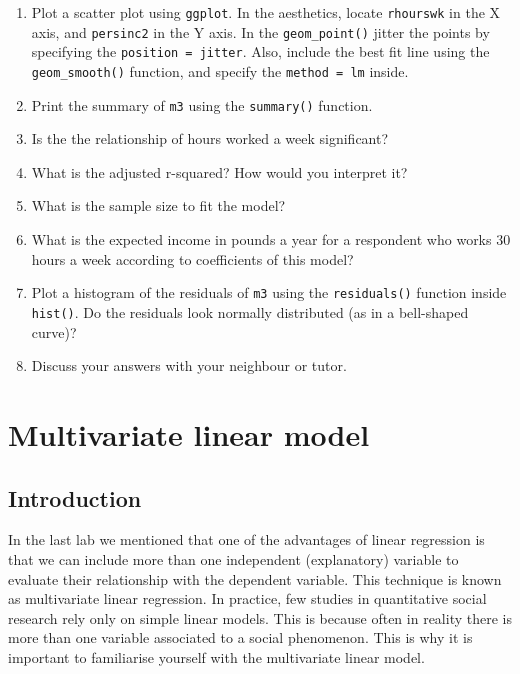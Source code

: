 \documentclass[
]{book}
\providecommand{\tightlist}{%
  \setlength{\itemsep}{0pt}\setlength{\parskip}{0pt}}
\begin{document}
\begin{enumerate}
\def\labelenumi{\arabic{enumi}.}
\tightlist
\item
  Plot a scatter plot using \texttt{ggplot}. In the aesthetics, locate \texttt{rhourswk} in the X axis, and \texttt{persinc2} in the Y axis. In the \texttt{geom\_point()} jitter the points by specifying the \texttt{position\ =\ \textquotesingle{}jitter\textquotesingle{}}. Also, include the best fit line using the \texttt{geom\_smooth()} function, and specify the \texttt{method\ =\ \textquotesingle{}lm\textquotesingle{}} inside.
\item
  Print the summary of \texttt{m3} using the \texttt{summary()} function.
\item
  Is the the relationship of hours worked a week significant?
\item
  What is the adjusted r-squared? How would you interpret it?
\item
  What is the sample size to fit the model?
\item
  What is the expected income in pounds a year for a respondent who works 30 hours a week according to coefficients of this model?
\item
  Plot a histogram of the residuals of \texttt{m3} using the \texttt{residuals()} function inside \texttt{hist()}. Do the residuals look normally distributed (as in a bell-shaped curve)?
\item
  Discuss your answers with your neighbour or tutor.
\end{enumerate}

\hypertarget{multi-lm}{%
\chapter{Multivariate linear model}\label{multi-lm}}

\hypertarget{introduction-2}{%
\section{Introduction}\label{introduction-2}}

In the last lab we mentioned that one of the advantages of linear regression is that we can include more than one independent (explanatory) variable to evaluate their relationship with the dependent variable. This technique is known as multivariate linear regression. In practice, few studies in quantitative social research rely only on simple linear models. This is because often in reality there is more than one variable associated to a social phenomenon. This is why it is important to familiarise yourself with the multivariate linear model.
\end{document}
